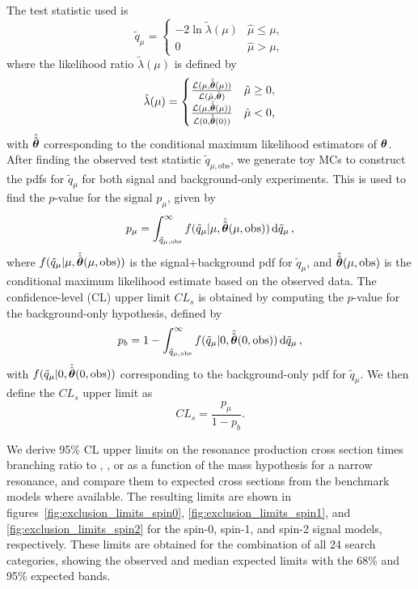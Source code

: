 The test statistic used is
\begin{equation}
  \tilde{q}_\mu=\begin{cases}
    -2\ln\tilde{\lambda}(\mu) & \hat{\mu}\leq\mu,\\
    0 & \hat{\mu}>\mu,
  \end{cases}
\end{equation}
where the likelihood ratio $\tilde{\lambda}(\mu)$ is defined by
\begin{equation}
  \tilde{\lambda}(\mu)=\begin{cases}
    \frac{\mathcal{L}(\mu,\hat{\hat{\vb*{\theta}}}(\mu))}{\mathcal{L}(\hat{\mu},\hat{\vb*{\theta}})} & \hat{\mu}\geq0,\\
    \frac{\mathcal{L}(\mu,\hat{\hat{\vb*{\theta}}}(\mu))}{\mathcal{L}(0,\hat{\hat{\vb*{\theta}}}(0))} & \hat{\mu}<0,
  \end{cases}
\end{equation}
with $\hat{\hat{\vb*{\theta}}}$ corresponding to the conditional maximum likelihood estimators of $\vb*{\theta}$.
After finding the observed test statistic $\tilde{q}_{\mu,\mathrm{obs}}$, we generate toy MCs to construct the pdfs for $\tilde{q}_\mu$ for both signal and background-only experiments.
This is used to find the $p$-value for the signal $p_\mu$, given by
\begin{equation}
  p_\mu=\int_{\tilde{q}_{\mu,\mathrm{obs}}}^\infty f(\tilde{q}_\mu|\mu,\hat{\hat{\vb*{\theta}}}(\mu,\mathrm{obs}))\dd{\tilde{q}_\mu},
\end{equation}
where $f(\tilde{q}_\mu|\mu,\hat{\hat{\vb*{\theta}}}(\mu,\mathrm{obs}))$ is the signal+background pdf for $\tilde{q}_\mu$, and $\hat{\hat{\vb*{\theta}}}(\mu,\mathrm{obs})$ is the conditional maximum likelihood estimate based on the observed data.
The confidence-level (CL) upper limit $CL_s$ is obtained by computing the $p$-value for the background-only hypothesis, defined by
\begin{equation}
  p_b=1-\int_{\tilde{q}_{\mu,\mathrm{obs}}}^\infty f(\tilde{q}_\mu|0,\hat{\hat{\vb*{\theta}}}(0,\mathrm{obs}))\dd{\tilde{q}_\mu},
\end{equation}
with $f(\tilde{q}_\mu|0,\hat{\hat{\vb*{\theta}}}(0,\mathrm{obs}))$ corresponding to the background-only pdf for $\tilde{q}_\mu$.
We then define the $CL_s$ upper limit as
\begin{equation}
  CL_s=\frac{p_\mu}{1-p_b}.
\end{equation}

We derive 95\% CL upper limits on the resonance production cross section times branching ratio to \WW, \WZ, or \WH as a function of the mass hypothesis \MX for a narrow resonance, and compare them to expected cross sections from the benchmark models where available.
The resulting limits are shown in figures~\ref{fig:exclusion_limits_spin0}, \ref{fig:exclusion_limits_spin1}, and \ref{fig:exclusion_limits_spin2} for the spin-0, spin-1, and spin-2 signal models, respectively.
These limits are obtained for the combination of all 24 search categories, showing the observed and median expected limits with the 68\% and 95\% expected bands.

